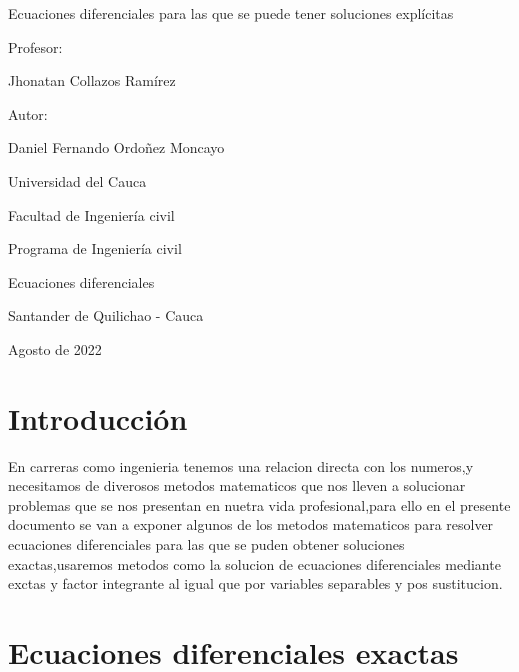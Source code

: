 \documentclass[l etterpaper,11pt]{article}
\begin{document}
\begin{titlepage}
\centering

\Large Ecuaciones diferenciales para las que se puede tener soluciones explícitas \par

\vspace{5cm}

\Large Profesor: \par
\Large Jhonatan Collazos Ramírez \par
\vspace{6cm}

\Large Autor: \par
\Large Daniel Fernando Ordoñez Moncayo \par
\vspace{6cm}

{\Large Universidad del Cauca \par}
{\large Facultad de Ingenier\'ia civil \par}
{\large Programa de Ingenier\'ia civil \par}
{\large Ecuaciones diferenciales  \par}
{\large Santander de Quilichao - Cauca \par}
{\Large Agosto de 2022 \par}
\end{titlepage}


\pagebreak

\tableofcontents


\newpage
\section{Introducción}

En carreras como ingenieria tenemos una relacion directa con los numeros,y necesitamos de diverosos metodos matematicos que nos lleven a solucionar problemas que se nos presentan en nuetra vida profesional,para ello en el presente documento se van a exponer algunos de los metodos matematicos para resolver ecuaciones diferenciales para las que se puden obtener soluciones exactas,usaremos metodos como la solucion de ecuaciones diferenciales mediante exctas y factor integrante al igual que por variables separables y pos sustitucion.

\newpage

{\section{Ecuaciones diferenciales exactas}}
\end{document}
